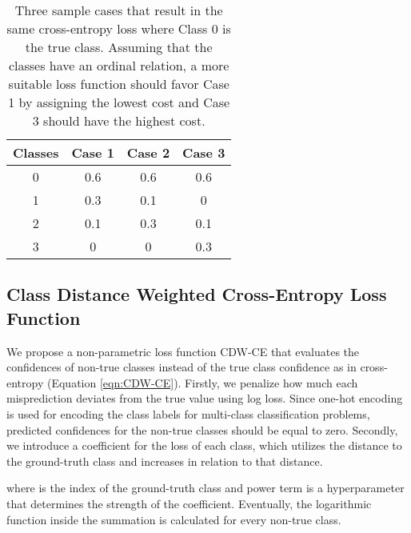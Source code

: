 \documentclass[runningheads]{llncs}
\begin{document}
\begin{table}[]
\vspace{-5mm}
\caption{Three sample cases that result in the same cross-entropy loss where Class 0 is the true class. Assuming that the classes have an ordinal relation, a more suitable loss function should favor Case 1 by assigning the lowest cost and Case 3 should have the highest cost. }
\label{tab:ce_loss_samples}
\begin{adjustbox}{center}
\begin{tabular}{c|ccc}
\textbf{Classes} & \textbf{Case 1} & \textbf{Case 2} & \textbf{Case 3} \\ \hline
0                & 0.6               & 0.6               & 0.6               \\
1                & 0.3               & 0.1               & 0                 \\
2                & 0.1               & 0.3               & 0.1               \\
3                & 0                 & 0                 & 0.3              
\end{tabular}
\end{adjustbox}
\vspace{-5mm}
\end{table}

\subsection{Class Distance Weighted Cross-Entropy Loss Function}

We propose a non-parametric loss function CDW-CE that evaluates the confidences of non-true classes instead of the true class confidence as in cross-entropy (Equation \ref{eqn:CDW-CE}). Firstly, we penalize how much each misprediction deviates from the true value using log loss. Since one-hot encoding is used for encoding the class labels for multi-class classification problems, predicted confidences for the non-true classes should be equal to zero. Secondly, we introduce a coefficient for the loss of each class, which utilizes the distance to the ground-truth class and increases in relation to that distance.



\noindent where  is the index of the ground-truth class and power term  is a hyperparameter that determines the strength of the coefficient. Eventually, the logarithmic function inside the summation is calculated for every non-true class.
\end{document}
